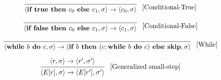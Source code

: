 \[
\begin{prooftree}
\infer0{
\langle \textbf{if } \textbf{true} \textbf{ then } c_0 \textbf{ else } c_1, \sigma  \rangle
\rightarrow
\langle c_0, \sigma \rangle 
}
\end{prooftree} \; \; \; [\text{Conditional-True}]
\]

\[
\begin{prooftree}
\infer0{
\langle \textbf{if } \textbf{false} \textbf{ then } c_0 \textbf{ else } c_1, \sigma  \rangle
\rightarrow
\langle c_1, \sigma \rangle 
}
\end{prooftree} \; \; \; [\text{Conditional-False}]
\]

\[
\begin{prooftree}
\infer0{
\langle \textbf{while } b \textbf{ do } c, \sigma \rangle
\rightarrow
\langle \textbf{if } b \textbf{ then } (c; \textbf{while } b \textbf{ do } c)
\textbf{ else } \textbf{skip}, \sigma \rangle
}
\end{prooftree} \; \; \; [\text{While}]
\]


\[
\begin{prooftree}
\hypo{
	\langle r, \sigma \rangle
	\rightarrow
	\langle r^\prime, \sigma^\prime \rangle
}
\infer1{
	\langle E[r], \sigma \rangle
	\rightarrow
	\langle E[r^\prime], \sigma^\prime \rangle
}
\end{prooftree} \; \; \; [\text{Generalized small-step}]
\]
